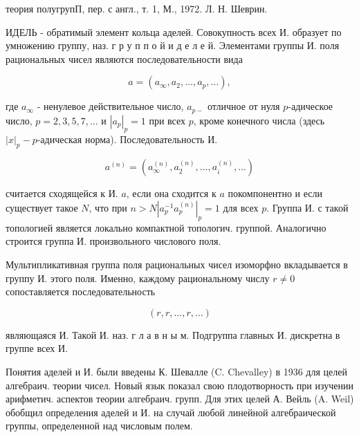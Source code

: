 \documentclass[10pt]{article}
\begin{document}
теория полугрупП, пер. с англ., т. 1, М., 1972. Л. Н. Шеврин.



ИДЕЛЬ - обратимый элемент кольца аделей. Совокупность всех И. образует по умножению группу, наз. г р у п п о й и д е л е й. Элементами группы И. поля рациональных чисел являются последовательности вида



\[

a=\left(a_{\infty}, a_{2}, \ldots, a_{p}, \ldots\right),

\]



где $a_{\infty}$ - ненулевое действительное число, $a_{p-}$ отличное от нуля $p$-адическое число, $p=2,3,5,7, \ldots$ и $\left|a_{p}\right|_{p}=1$ при всех $p$, кроме конечного числа (здесь $|x|_{p}-p$-адическая норма). Последовательность И.



\[

a^{(n)}=\left(a_{\infty}^{(n)}, a_{2}^{(n)}, \ldots, a_{i}^{(n)}, \ldots\right)

\]



считается сходящейся к И. $a$, если она сходится к $a$ покомпонентно и если существует такое $N$, что при $n>N\left|a_{p}^{-1} a_{p}^{(n)}\right|_{p}=1$ для всех $p$. Группа И. с такой топологией является локально компактной топологич. группой. Аналогично строится группа И. произвольного числового поля.



Мультипликативная группа поля рациональных чисел изоморфно вкладывается в группу И. этого поля. Именно, каждому рациональному числу $r \neq 0$ сопоставляется последовательность



\[

(r, r, \ldots, r, \ldots)

\]



являющаяся И. Такой И. наз. г л а в н ы м. Подгруппа главных И. дискретна в группе всех И.



Понятия аделей и И. были введены К. Шевалле (C. Chevalley) в 1936 для целей алгебраич. теории чисел. Новый язык показал свою плодотворность при изучении арифметич. аспектов теории алгебраич. групп. Для этих целей А. Вейль (A. Weil) обобщил определения аделей и И. на случай любой линейной алгебраической группы, определенной над числовым полем.
\end{document}
